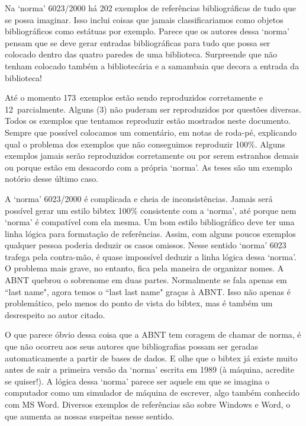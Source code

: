 \documentclass[espacosimples]{abnt}
\newcommand{\OKs}{173}
\newcommand{\quaseOKs}{12}
\newcommand{\nadaOK}{3}
\begin{document}
Na `norma' 6023/2000\cite{NBR6023:2000} há 202 exemplos de referências
bibliográficas de tudo que se possa imaginar. Isso inclui coisas que
jamais classificariamos como objetos bibliográficos como estátuas
por exemplo. Parece que os autores dessa `norma' pensam que se
deve gerar entradas bibliográficas para tudo que possa ser colocado
dentro das quatro paredes de uma biblioteca. Surpreende que não tenham
colocado também a bibliotecária e a samambaia que decora a entrada
da biblioteca!

Até o momento \OKs\ exemplos
estão sendo reproduzidos corretamente e \quaseOKs\ parcialmente.
Alguns (\nadaOK) não puderam ser reproduzidos por questões diversas.
Todos os
exemplos que tentamos reproduzir estão mostrados neste documento.
Sempre que possível colocamos um comentário, em notas de roda-pé,
explicando qual o problema dos exemplos que não conseguimos reproduzir 100\%.
Alguns exemplos jamais serão reproduzidos corretamente ou por serem estranhos
demais ou porque estão em desacordo com a própria `norma'.
As teses são um exemplo notório desse último caso.

A `norma' 6023/2000\cite{NBR6023:2000} é complicada e cheia de inconsistências.
Jamais será
possível gerar um estilo bibtex 100\% consistente com a `norma', até
porque nem `norma' é compatível com ela mesma. Um bom estilo bibliográfico
deve ter uma linha lógica para formatação de referências.
Assim, com alguns poucos exemplos qualquer pessoa poderia deduzir os casos
omissos. Nesse sentido `norma' 6023 trafega pela contra-mão, é quase
impossível deduzir a linha lógica dessa `norma'. O problema mais grave, no
entanto, fica pela maneira de organizar nomes. A ABNT quebrou o sobrenome
em duas partes. Normalmente se fala apenas em ``last name", agora temos
o ``last last name" graças à ABNT. Isso não apenas é problemático,
pelo menos do ponto de vista do bibtex, mas é também um desrespeito ao
autor citado.

O que parece óbvio dessa coisa que a ABNT tem coragem de chamar de norma,
é que não ocorreu aos seus autores que bibliografias possam
ser geradas automaticamente a partir de bases de dados.
E olhe que o bibtex já existe muito antes de sair a primeira versão
da `norma' escrita em 1989 (à máquina, acredite se quiser!).
A lógica dessa `norma' parece ser aquele em que se imagina o
computador como um simulador de máquina de escrever, algo também
conhecido com MS Word. Diversos exemplos de referências são
sobre Windows e Word, o que aumenta as nossas suspeitas nesse
sentido.
\end{document}
